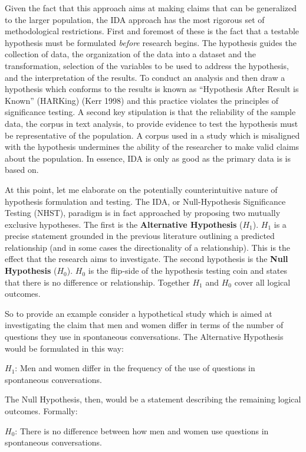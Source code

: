 \documentclass[
  letterpaper,
]{scrbook}
\begin{document}
Given the fact that this approach aims at making claims that can be
generalized to the larger population, the IDA approach has the most
rigorous set of methodological restrictions. First and foremost of these
is the fact that a testable hypothesis must be formulated \emph{before}
research begins. The hypothesis guides the collection of data, the
organization of the data into a dataset and the transformation,
selection of the variables to be used to address the hypothesis, and the
interpretation of the results. To conduct an analysis and then draw a
hypothesis which conforms to the results is known as ``Hypothesis After
Result is Known'' (HARKing) (Kerr 1998) and this practice violates the
principles of significance testing. A second key stipulation is that the
reliability of the sample data, the corpus in text analysis, to provide
evidence to test the hypothesis must be representative of the
population. A corpus used in a study which is misaligned with the
hypothesis undermines the ability of the researcher to make valid claims
about the population. In essence, IDA is only as good as the primary
data is is based on.

At this point, let me elaborate on the potentially counterintuitive
nature of hypothesis formulation and testing. The IDA, or
Null-Hypothesis Significance Testing (NHST), paradigm is in fact
approached by proposing two mutually exclusive hypotheses. The first is
the \textbf{Alternative Hypothesis} (\(H_1\)). \(H_1\) is a precise
statement grounded in the previous literature outlining a predicted
relationship (and in some cases the directionality of a relationship).
This is the effect that the research aims to investigate. The second
hypothesis is the \textbf{Null Hypothesis} (\(H_0\)). \(H_0\) is the
flip-side of the hypothesis testing coin and states that there is no
difference or relationship. Together \(H_1\) and \(H_0\) cover all
logical outcomes.

So to provide an example consider a hypothetical study which is aimed at
investigating the claim that men and women differ in terms of the number
of questions they use in spontaneous conversations. The Alternative
Hypothesis would be formulated in this way:

\(H_1\): Men and women differ in the frequency of the use of questions
in spontaneous conversations.

The Null Hypothesis, then, would be a statement describing the remaining
logical outcomes. Formally:

\(H_0\): There is no difference between how men and women use questions
in spontaneous conversations.
\end{document}
